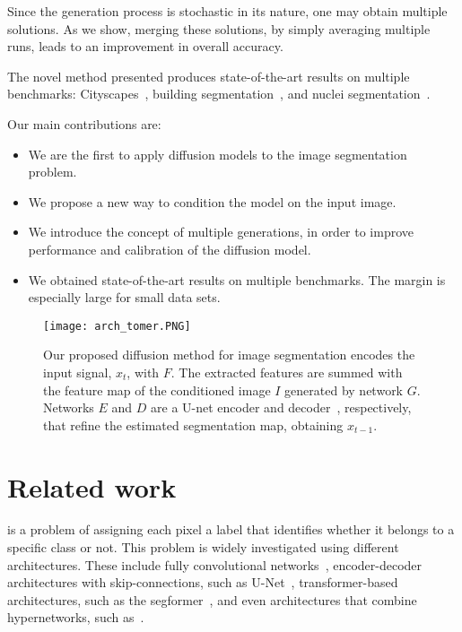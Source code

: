 \documentclass[10pt,twocolumn,letterpaper]{article}
\begin{document}
Since the generation process is stochastic in its nature, one may obtain multiple solutions. As we show, merging these solutions, by simply averaging multiple runs, leads to an improvement in overall accuracy.

The novel method presented produces state-of-the-art results on multiple benchmarks: Cityscapes~\cite{Cordts2016Cityscapes}, building segmentation~\cite{rottensteiner2014isprs}, and nuclei segmentation~\cite{kumar2019multi,kumar2017dataset}. 

Our main contributions are:
\begin{itemize}
  \item We are the first to apply diffusion models to the image segmentation problem. 
  \item We propose a new way to condition the model on the input image.
  \item We introduce the concept of multiple generations, in order to improve performance and calibration of the diffusion model.
  \item We obtained state-of-the-art results on multiple benchmarks. The margin is especially large for small data sets.
\end{itemize}

\begin{figure*}[t]
    \centering
    \texttt{[image: arch\_tomer.PNG]}
    \caption{Our proposed diffusion method for image segmentation encodes the input signal, $x_t$, with $F$. The extracted features are summed with the feature map of the conditioned image $I$ generated by network $G$. Networks $E$ and $D$ are a U-net encoder and decoder~\cite{ronneberger2015u,nichol2021improved}, respectively, that refine the estimated segmentation map, obtaining $x_{t-1}$.}
    \label{fig:method}
\end{figure*}

\section{Related work}
 is a problem of assigning each pixel a label that identifies whether it belongs to a specific class or not. This problem is widely investigated using different architectures. These include fully convolutional networks~\cite{long2015fully}, encoder-decoder architectures with skip-connections, such as U-Net~\cite{ronneberger2015u}, transformer-based architectures, such as the segformer~\cite{xie2021segformer}, and even architectures that combine hypernetworks, such as~\cite{nirkin2021hyperseg}.
\end{document}
